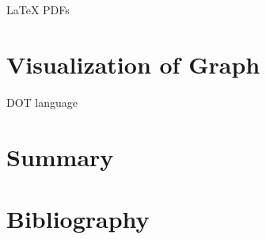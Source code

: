 \documentclass{article}
\begin{document}
\begin{multicols}{2}
\LaTeX\cite{1994_Latex} PDFs

\section{Visualization of Graph\label{sec:visualization}}

DOT language\cite{2015_Graphviz} 

\section{Summary}

\section{Bibliography}


\end{multicols}

\newpage
\appendix
%
\end{document}
